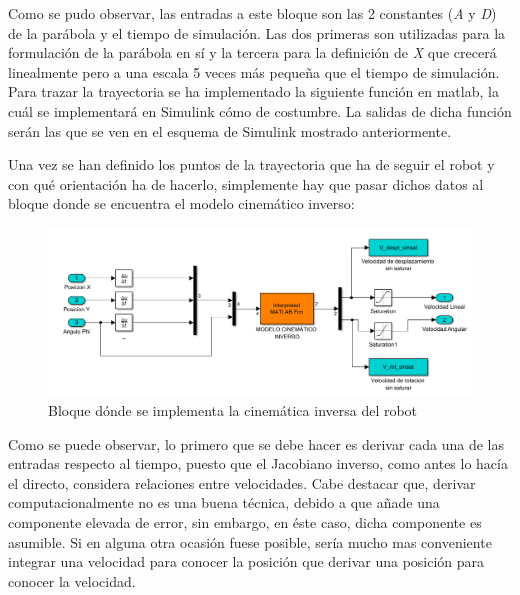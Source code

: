 \documentclass[a4paper,twoside]{article}
\begin{document}
Como se pudo observar, las entradas a este bloque son las 2 constantes (\textit{A} y \textit{D}) de la parábola y el tiempo de simulación. Las dos primeras son utilizadas para la formulación de la parábola en sí y la tercera para la definición de \textit{X} que crecerá linealmente pero a una escala 5 veces más pequeña que el tiempo de simulación.\\

Para trazar la trayectoria se ha implementado la siguiente función en matlab, la cuál se implementará en Simulink cómo de costumbre. La salidas de dicha función serán las que se ven en el esquema de Simulink mostrado anteriormente.





Una vez se han definido los puntos de la trayectoria que ha de seguir el robot y con qué orientación ha de hacerlo, simplemente hay que pasar dichos datos al bloque donde se encuentra el modelo cinemático inverso:

\begin{figure}[h!]
	\centering
	\includegraphics[width=.7\textwidth]{simulink_MCI_3}
	\caption{Bloque dónde se implementa la cinemática inversa del robot}
\end{figure}

Como se puede observar, lo primero que se debe hacer es derivar cada una de las entradas respecto al tiempo, puesto que el Jacobiano inverso, como antes lo hacía el directo, considera relaciones entre velocidades. Cabe destacar que, derivar computacionalmente no es una buena técnica, debido a que añade una componente elevada de error, sin embargo, en éste caso, dicha componente es asumible. Si en alguna otra ocasión fuese posible, sería mucho mas conveniente integrar una velocidad para conocer la posición que derivar una posición para conocer la velocidad.\\
\end{document}
